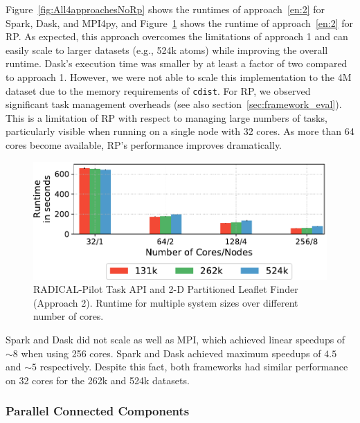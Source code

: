 Figure~\ref{fig:All4approachesNoRp} shows the runtimes of approach~\ref{en:2}
for Spark, Dask, and MPI4py, and Figure~\ref{fig:rpLF} shows the runtime of
approach~\ref{en:2} for RP. As expected, this approach overcomes the
limitations of approach 1 and can easily scale to larger datasets (e.g., 524k
atoms) while improving the overall runtime. Dask's execution time was smaller by
at least a factor of two compared to
approach 1. However, we were not able to scale this implementation to the 4M
dataset due to the memory requirements of \texttt{cdist}. For RP, we
observed significant task management overheads (see also
section~\ref{sec:framework_eval}). This is a limitation of RP with
respect to managing large numbers of tasks, particularly visible when running on
a single node with 32 cores. As more than 64 cores become available, 
RP's performance improves dramatically.

\begin{figure}[t]
    \centering
    \includegraphics[width=.75\textwidth]{figures/data_analytics_hpc/task_par/rpLF.pdf}
    \caption{RADICAL-Pilot Task API and 2-D Partitioned Leaflet Finder (Approach
    2). Runtime for multiple system sizes over different number of cores.}
    \label{fig:rpLF}
\end{figure}

Spark and Dask did not scale as well as MPI, which achieved linear speedups of
$\sim8$ when using 256 cores. Spark and Dask achieved maximum speedups of
$4.5$ and $\sim5$ respectively. Despite this fact, both frameworks had similar
performance on 32 cores for the 262k and 524k datasets.

\subsubsection*{Parallel Connected Components}

